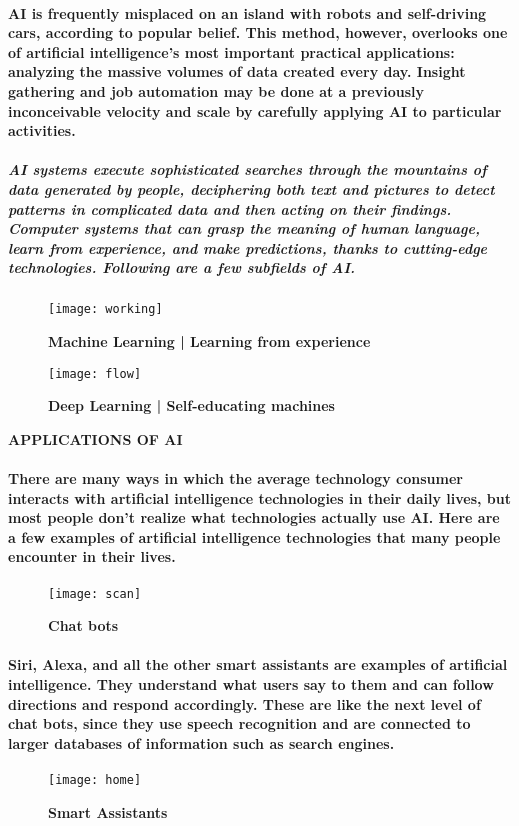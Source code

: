 \documentclass{article}
\begin{document}
	\paragraph{ AI is frequently misplaced on an island with robots and self-driving cars, according to popular belief. This method, however, overlooks one of artificial intelligence's most important practical applications: analyzing the massive volumes of data created every day. Insight gathering and job automation may be done at a previously inconceivable velocity and scale by carefully applying AI to particular activities.}
	\subparagraph{AI systems execute sophisticated searches through the mountains of data generated by people, deciphering both text and pictures to detect patterns in complicated data and then acting on their findings. Computer systems that can grasp the meaning of human language, learn from experience, and make predictions, thanks to cutting-edge technologies. Following are a few subfields of AI.}
\begin{figure}[H]
\centering
\texttt{[image: working]}
\caption{{\large \textbf{Machine Learning | Learning from experience}}}
\end{figure}
\begin{figure}[H]
\centering
\texttt{[image: flow]}
\caption{{\large \textbf{Deep Learning | Self-educating machines}}}
\end{figure}	
\newpage
\begin{LARGE}\begin{center} \textbf{ APPLICATIONS OF AI} \end{center}\end{LARGE}
	\paragraph{ There are many ways in which the average technology consumer interacts with artificial intelligence technologies in their daily lives, but most people don’t realize what technologies actually use AI. Here are a few examples of artificial intelligence technologies that many people encounter in their lives.}
\begin{figure}[H]
\centering
\texttt{[image: scan]}
\caption{{\large \textbf{Chat bots}}}
\end{figure}	
	\paragraph{Siri, Alexa, and all the other smart assistants are examples of artificial intelligence. They understand what users say to them and can follow directions and respond accordingly. These are like the next level of chat bots, since they use speech recognition and are connected to larger databases of information such as search engines.}
\begin{figure}[H]
\centering
\texttt{[image: home]}
\caption{{\large \textbf{Smart Assistants}}}
\end{figure}	
\end{document}
